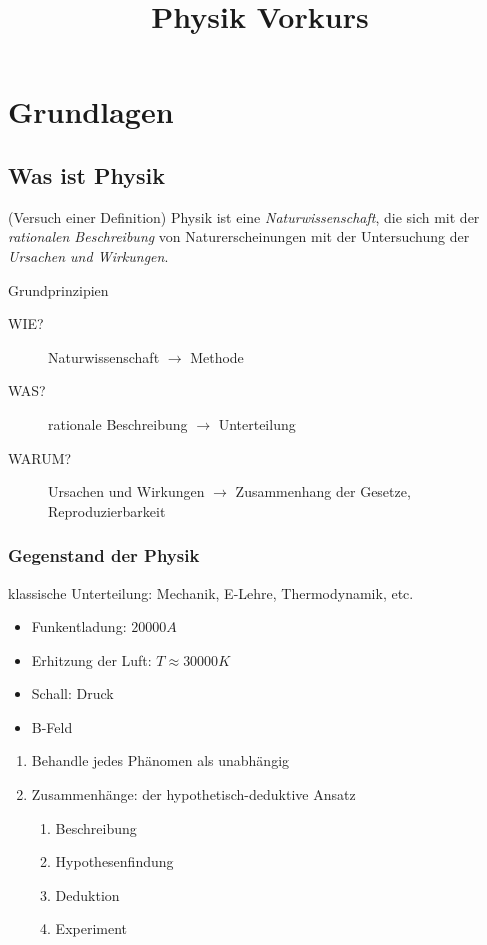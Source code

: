 \documentclass[a4paper,10pt]{scrartcl}
\title{Physik Vorkurs}
\begin{document}
\maketitle

\tableofcontents
\newpage
\section{Grundlagen}
\subsection{Was ist Physik}
\begin{seg}{(Versuch einer Definition)}
 Physik ist eine \emph{Naturwissenschaft}, die sich mit der \emph{rationalen Beschreibung} von Naturerscheinungen mit der Untersuchung der \emph{Ursachen und Wirkungen}.
\end{seg}
\begin{seg}{Grundprinzipien}

\begin{description}
 \item[WIE?] Naturwissenschaft $\longrightarrow$ Methode
 \item[WAS?] rationale Beschreibung $\longrightarrow$ Unterteilung
 \item[WARUM?] Ursachen und Wirkungen $\longrightarrow$ Zusammenhang der Gesetze, Reproduzierbarkeit
\end{description}
\end{seg}

\subsubsection{Gegenstand der Physik}
\begin{seg}{klassische Unterteilung:} 
 Mechanik, E-Lehre, Thermodynamik, etc.
\end{seg}

\begin{ex}[Blitz]
 \begin{itemize}
  \item Funkentladung: $20000 A$
  \item Erhitzung der Luft: $T \approx 30000 K$
  \item Schall: Druck
  \item B-Feld
 \end{itemize}
\end{ex}

\begin{enumerate}
 \item Behandle jedes Phänomen als unabhängig
 \item Zusammenhänge: der hypothetisch-deduktive Ansatz
\begin{enumerate}
 \item Beschreibung
 \item Hypothesenfindung
 \item Deduktion
 \item Experiment
\end{enumerate}

\end{enumerate}
\end{document}
